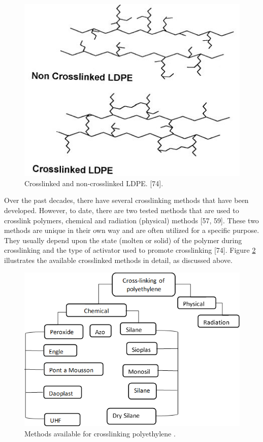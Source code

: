 \documentclass[12pt]{report}
\begin{document}
\begin{figure}[H]
    \centering
    \includegraphics[width=.6\textwidth]{crosslinked_and_non_crosslinked_ldpe.jpg}
    \caption{Crosslinked and non-crosslinked LDPE. [74].}
    \label{ch3:figure:ldpe}
\end{figure}

Over the past decades, there have several crosslinking methods that have been developed. However, to date, there are two tested methods that are used to crosslink polymers, chemical and radiation (physical) methods [57, 59]. These two methods are unique in their own way and are often utilized for a specific purpose. They usually depend upon the state (molten or solid) of the polymer during crosslinking and the type of activator used to promote crosslinking [74]. Figure \ref{ch3:figure:crosslinking_methods} illustrates the available crosslinked methods in detail, as discussed above.

\begin{figure}[H]
    \centering
    \includegraphics[width=.75\textwidth]{methods_available_for_crosslinking_polyethylene.png}
    \caption{Methods available for crosslinking polyethylene \cite{patterson2022cross}.}
    \label{ch3:figure:crosslinking_methods}
\end{figure}
\end{document}
